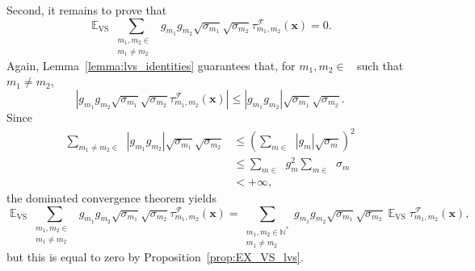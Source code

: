 \documentclass[twoside,11pt]{book}
\numberwithin{theorem}{chapter}
\numberwithin{definition}{chapter}
\numberwithin{proposition}{chapter}
\numberwithin{corollary}{chapter}
\numberwithin{example}{chapter}
\numberwithin{lemma}{chapter}
\DeclareMathOperator{\VS}{\mathrm{VS}}
\DeclareMathOperator{\EX}{\mathbb{E}}
\DeclareMathOperator{\F}{\mathcal{F}}
\DeclareMathOperator{\Ns}{\mathbb{N}^{*}}
\begin{document}
Second, it remains to prove that
\begin{equation}\label{eq:interchange_EX_VS_cross_lvs}
\EX_{\VS} \sum\limits_{\substack{m_{1},m_{2} \in \Ns \\ m_{1} \neq m_{2}}}  g_{m_{1}}g_{m_{2}} \sqrt{\sigma_{m_{1}}} \sqrt{\sigma_{m_{2}}} \tau_{m_{1},m_{2}}^{\F}(\bm{x})
= 0.
\end{equation}
Again, Lemma~\ref{lemma:lvs_identities} guarantees that, for $m_{1},m_{2} \in \Ns$ such that $m_{1} \neq m_{2}$,
\begin{equation}
| g_{m_{1}}g_{m_{2}} \sqrt{\sigma_{m_{1}}} \sqrt{\sigma_{m_{2}}} \tau_{m_{1},m_{2}}^{\F}(\bm{x})| \leq | g_{m_{1}}g_{m_{2}} | \sqrt{\sigma_{m_{1}}} \sqrt{\sigma_{m_{2}}}.
\end{equation}
Since
\begin{align}
\sum\limits_{m_{1} \neq m_{2} \in \Ns} |g_{m_{1}}g_{m_{2}}| \sqrt{\sigma_{m_{1}}} \sqrt{\sigma_{m_{2}}}
& \leq  \left(\sum\limits_{m \in \Ns} |g_{m}| \sqrt{\sigma_{m}} \right)^{2} \nonumber \\
& \leq \sum\limits_{m \in \Ns}g_{m}^{2} \sum\limits_{m \in \Ns} \sigma_{m} \nonumber \\
& < + \infty,
\end{align}
the dominated convergence theorem yields 
$$
\EX_{\VS} \sum\limits_{\substack{m_{1},m_{2} \in \Ns \\ m_{1} \neq m_{2}}}  g_{m_{1}}g_{m_{2}} \sqrt{\sigma_{m_{1}}} \sqrt{\sigma_{m_{2}}} \tau_{m_{1},m_{2}}^{\F}(\bm{x})
= \sum\limits_{\substack{m_{1},m_{2} \in \mathbb{N}^{*} \\ m_{1} \neq m_{2}}}  g_{m_{1}}g_{m_{2}} \sqrt{\sigma_{m_{1}}} \sqrt{\sigma_{m_{2}}} \EX_{\VS} \tau_{m_{1},m_{2}}^{\F}(\bm{x}),
$$
but this is equal to zero by Proposition~\ref{prop:EX_VS_lvs}.
\end{document}
